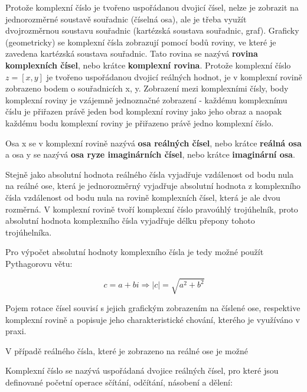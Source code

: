 Protože komplexní číslo je tvořeno uspořádanou dvojicí čísel, nelze je zobrazit na jednorozměrné soustavě souřadnic (číselná osa), ale je třeba využít dvojrozměrnou soustavu souřadnic (kartézská soustava souřadnic, graf). Graficky (geometricky) se komplexní čísla zobrazují pomocí bodů roviny, ve které je zavedena kartézská soustava souřadnic. Tato rovina se nazývá {\bf rovina komplexních čísel}, nebo krátce {\bf komplexní rovina}. Protože komplexní číslo $z=[x,y] $ je tvořeno uspořádanou dvojicí reálných hodnot, je v komplexní rovině zobrazeno bodem o souřadnicích x, y. Zobrazení mezi komplexními čísly, body komplexní roviny je vzájemně jednoznačné zobrazení - každému komplexnímu číslu je přiřazen právě jeden bod komplexní roviny jako jeho obraz a naopak každému bodu komplexní roviny je přiřazeno právě jedno komplexní číslo. 

Osa x se v komplexní rovině nazývá {\bf osa reálných čísel}, nebo krátce {\bf reálná osa} a osa y se nazývá {\bf osa ryze imaginárních čísel}, nebo krátce {\bf imaginární osa}. 

\vskip 4mm
\centerline{}
\vskip 4mm


Stejně jako absolutní hodnota reálného čísla vyjadřuje vzdálenost od bodu nula na reálné ose, která je jednorozměrný vyjadřuje absolutní hodnota z komplexního čísla vzdálenost od bodu nula na rovině komplexních čísel, která je ale dvou rozměrná. V komplexní rovině tvoří komplexní číslo pravoúhlý trojúhelník, proto absolutní hodnota komplexního čísla vyjadřuje délku přepony tohoto trojúhelníka. 


Pro výpočet absolutní hodnoty komplexního čísla je tedy možné použít Pythagorovu větu:

$$ c = a + bi \Rightarrow |c| = \sqrt{a^2 + b^2} $$



Pojem rotace čísel souvisí s jejich grafickým zobrazením na číslené ose, respektive komplexní rovině a popisuje jeho charakteristické chování, kterého je využíváno v praxi. 

V případě reálného čísla, které je zobrazeno na reálné ose je možné 



Komplexní číslo se nazývá uspořádaná dvojice reálných čísel, pro které jsou definované početní operace sčítání, odčítání, násobení a dělení:

